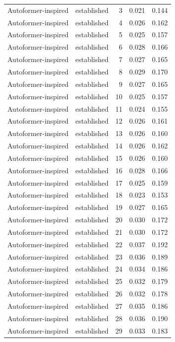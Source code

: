 \begin{tabular}{llrrr}
Autoformer-inspired & established & 3 & 0.021 & 0.144 \\
Autoformer-inspired & established & 4 & 0.026 & 0.162 \\
Autoformer-inspired & established & 5 & 0.025 & 0.157 \\
Autoformer-inspired & established & 6 & 0.028 & 0.166 \\
Autoformer-inspired & established & 7 & 0.027 & 0.165 \\
Autoformer-inspired & established & 8 & 0.029 & 0.170 \\
Autoformer-inspired & established & 9 & 0.027 & 0.165 \\
Autoformer-inspired & established & 10 & 0.025 & 0.157 \\
Autoformer-inspired & established & 11 & 0.024 & 0.155 \\
Autoformer-inspired & established & 12 & 0.026 & 0.161 \\
Autoformer-inspired & established & 13 & 0.026 & 0.160 \\
Autoformer-inspired & established & 14 & 0.026 & 0.162 \\
Autoformer-inspired & established & 15 & 0.026 & 0.160 \\
Autoformer-inspired & established & 16 & 0.028 & 0.166 \\
Autoformer-inspired & established & 17 & 0.025 & 0.159 \\
Autoformer-inspired & established & 18 & 0.023 & 0.153 \\
Autoformer-inspired & established & 19 & 0.027 & 0.165 \\
Autoformer-inspired & established & 20 & 0.030 & 0.172 \\
Autoformer-inspired & established & 21 & 0.030 & 0.172 \\
Autoformer-inspired & established & 22 & 0.037 & 0.192 \\
Autoformer-inspired & established & 23 & 0.036 & 0.189 \\
Autoformer-inspired & established & 24 & 0.034 & 0.186 \\
Autoformer-inspired & established & 25 & 0.032 & 0.179 \\
Autoformer-inspired & established & 26 & 0.032 & 0.178 \\
Autoformer-inspired & established & 27 & 0.035 & 0.186 \\
Autoformer-inspired & established & 28 & 0.036 & 0.190 \\
Autoformer-inspired & established & 29 & 0.033 & 0.183 \\

\end{tabular}
